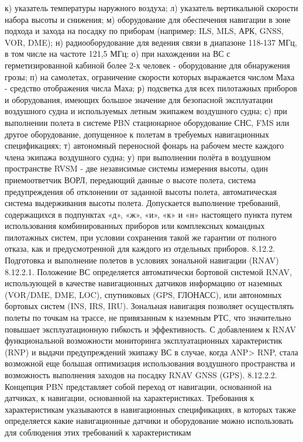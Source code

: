 к)	указатель температуры наружного воздуха;
л)	указатель вертикальной скорости набора высоты и снижения;
м)	оборудование для обеспечения навигации в зоне подхода и захода на посадку по приборам (например: ILS, MLS, АРК, GNSS, VOR, DME);
н)	радиооборудование для ведения связи в диапазоне 118-137 МГц, в том числе на частоте 121,5 МГц;
о)	при нахождении на ВС с герметизированной кабиной более 2-х человек - оборудование для обнаружения грозы;
п)	на самолетах, ограничение скорости которых выражается числом Маха - средство отображения числа Маха; 
р)	подсветка для всех пилотажных приборов и оборудования, имеющих большое значение для безопасной
эксплуатации воздушного судна и используемых летным экипажем воздушного судна;
с)	при выполнении полета в системе РBN стационарное оборудование СНС, FMS или другое оборудование, допущенное к полетам в требуемых навигационных спецификациях;
т)	автономный переносной фонарь на рабочем месте каждого члена экипажа воздушного судна;
у)	при выполнении полёта в воздушном пространстве RVSM - две независимые системы измерения высоты, один приемоответчик ВОРЛ, передающий данные о высоте полета, система предупреждения об отклонении от заданной высоты полета, автоматическая система выдерживания высоты полета.
Допускается выполнение требований, содержащихся в подпунктах «д», «ж», «и», «к» и «н» настоящего пункта путем использования комбинированных приборов или комплексных командных пилотажных систем, при условии сохранения такой же гарантии от полного отказа, как и предусмотренной для каждого из отдельных приборов.
8.12.2.	Подготовка и выполнение полетов в условиях зональной навигации (RNAV)
8.12.2.1. Положение ВС определяется автоматически бортовой системой RNAV, использующей в качестве навигационных датчиков информацию от наземных (VOR/DME, DME, LOC), спутниковых (GPS, ГЛОНАСС), или автономных бортовых систем (INS, IRS, IRU). Зональная навигация позволяет осуществлять полеты по точкам на трассе, не привязанным к наземным РТС, что значительно повышает эксплуатационную гибкость и эффективность.
С добавлением к RNAV функциональной возможности мониторинга эксплуатационных характеристик (RNP) и выдачи предупреждений экипажу ВС в случае, когда ANP> RNP, стала возможной еще большая оптимизация использования воздушного пространства и возможность выполнения заходов на посадку RNAV GNSS (GPS).
8.12.2.2. Концепция PBN представляет собой переход от навигации, основанной на датчиках, к навигации, основанной на характеристиках. Требования к характеристикам указываются в навигационных спецификациях, в которых также определяется какие навигационные датчики и оборудование можно использовать для соблюдения этих требований к характеристикам

